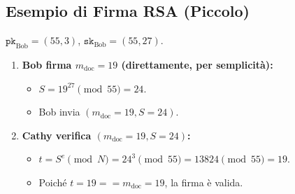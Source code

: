 \subsection{Esempio di Firma RSA (Piccolo)}
$\texttt{pk}_{\text{Bob}} = (55, 3)$, $\texttt{sk}_{\text{Bob}} = (55, 27)$.
\begin{enumerate}
    \item \textbf{Bob firma $m_{\text{doc}}=19$ (direttamente, per semplicità):}
    \begin{itemize}
        \item $S = 19^{27} \pmod{55} = 24$.
        \item Bob invia $(m_{\text{doc}}=19, S=24)$.
    \end{itemize}
    \item \textbf{Cathy verifica $(m_{\text{doc}}=19, S=24)$:}
    \begin{itemize}
        \item $t = S^e \pmod N = 24^3 \pmod{55} = 13824 \pmod{55} = 19$.
        \item Poiché $t=19 == m_{\text{doc}}=19$, la firma è valida.
    \end{itemize}
\end{enumerate}

